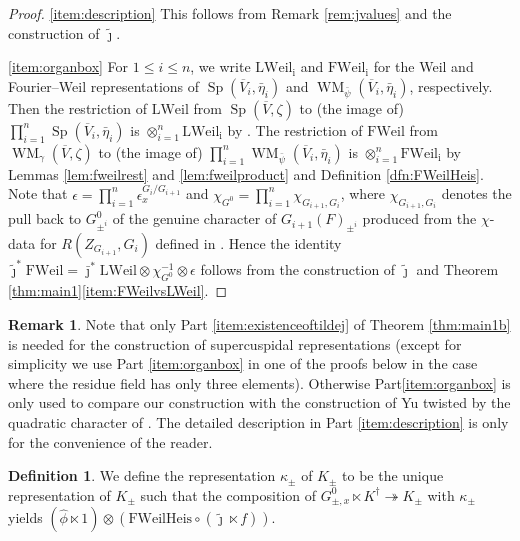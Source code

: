 \documentclass{article}
\def\ol#1{\overline{#1}}
\def\hat{\widehat}
\newcommand{\eps}{\epsilon}
\DeclareMathOperator{\Sp}{Sp}
\theoremstyle{definition}
\newtheorem{rem}[thm]{Remark}
\newtheorem{dfn}[thm]{Definition}
\numberwithin{equation}{subsection}
\renewcommand{\-}{\hyp{}}
\DeclareMathOperator{\WM}{WM}
\begin{document}
\begin{proof}
	
	\ref{item:description} This follows from Remark \ref{rem:jvalues} and the construction of $\tilde \jmath$.
	
	\ref{item:organbox} For $1 \leq i \leq n$, we write $\mathrm{LWeil_i}$ and $\mathrm{FWeil_i}$ for the Weil and Fourier--Weil representations of $\Sp(\ol{V}_i, \bar\eta_i)$ and $\WM_{\bar \psi}(\ol{V}_i, \bar \eta_i)$, respectively.
	Then the restriction of $\mathrm{LWeil}$ from $\Sp(\ol{V}, \zeta)$ to (the image of) $\prod_{i=1}^n\Sp(\ol{V}_i, \bar \eta_i)$ is $\otimes_{i=1}^n\mathrm{LWeil_i}$ by \cite[Corollary~2.5~and~Corollary~2.6]{Gerardin}.  The restriction of $\mathrm{FWeil}$ from $\WM_\gamma(\ol{V}, \zeta)$ to (the image of) $\prod_{i=1}^n\WM_{\bar\psi}(\ol{V}_i, \bar \eta_i)$ is $\otimes_{i=1}^n\mathrm{FWeil_i}$ by Lemmas \ref{lem:fweilrest} and \ref{lem:fweilproduct} and Definition \ref{dfn:FWeilHeis}.
	Note that $\eps=\prod_{i=1}^n \eps_x^{G_i/G_{i+1}}$ and $\chi_{G^0}=\prod_{i=1}^n \chi_{G_{i+1},G_{i}}$, where $\chi_{G_{i+1},G_{i}}$ denotes the pull back to $G^0_{\pm^i}$ of the genuine character of  $G_{i+1}(F)_{\pm^i}$ produced from the $\chi$-data for $R(Z_{G_{i+1}}, G_i)$ defined in \cite[\S4.2]{FKS23}. Hence the identity
	\( \tilde\jmath^*\mathrm{FWeil} = \bar\jmath^*\mathrm{LWeil} \otimes \chi_{G^0}^{-1} \otimes \epsilon\)
	follows from the construction of $\tilde \jmath$ and Theorem \ref{thm:main1}\ref{item:FWeilvsLWeil}.
	
	
	
\end{proof}
\begin{rem}
	Note that only Part \ref{item:existenceoftildej} of Theorem \ref{thm:main1b} is needed for the construction of supercuspidal representations (except for simplicity we use Part \ref{item:organbox} in one of the proofs below in the case where the residue field has only three elements). Otherwise Part\ref{item:organbox} is only used to compare our construction with the construction of Yu \cite{Yu01} twisted by the quadratic character of \cite{FKS23}. The detailed description in Part \ref{item:description} is only for the convenience of the reader.
\end{rem}


\begin{dfn}
	We define the representation $\kappa_{\pm}$ of $K_{\pm}$ to be the unique representation of $K_{\pm}$ such that the composition of $G^0_{\pm, x} \ltimes K^\dagger \twoheadrightarrow K_{\pm}$ with $\kappa_{\pm}$ yields $(\hat \phi \ltimes 1)\otimes (\mathrm{FWeilHeis} \circ (\tilde\jmath \ltimes f))$.
\end{dfn}
\end{document}
